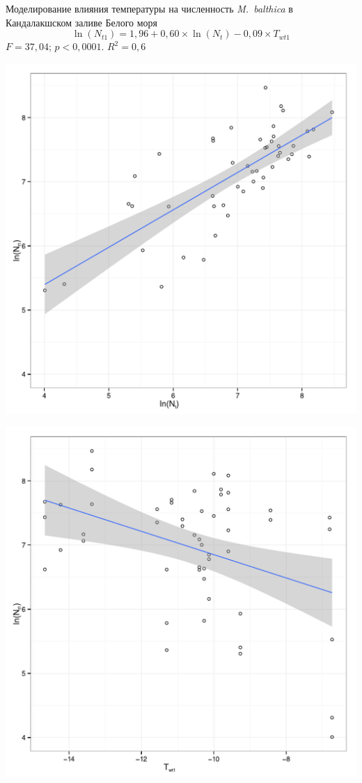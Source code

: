\documentclass{beamer}
\begin{document}
\begin{frame}{Моделирование влияния температуры на численность {\it M.~balthica} в Кандалакшском заливе Белого моря}
$$\ln(N_{t1}) = 1,96 + 0,60 \times \ln(N_{t}) - 0,09 \times T_{wt1}$$
{\footnotesize $F = 37,04$; $p < 0,0001$. $R^2 = 0,6$} \\
	\begin{minipage}[t]{.49\linewidth}
		\begin{center}
			\includegraphics[width=\textwidth]{./lodNt_vs_logNt1_1.pdf}
		\end{center}
	\end{minipage}
%
	\begin{minipage}[t]{.49\linewidth}
		\begin{center}
			\includegraphics[width=\textwidth]{./Twt1_vs_logNt1_1.pdf}

\end{center}
\end{minipage}
\end{frame}
\end{document}
